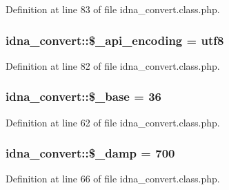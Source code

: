 Definition at line 83 of file idna\+\_\+convert.\+class.\+php.

\subsubsection[{\texorpdfstring{\$\+\_\+api\+\_\+encoding}{$_api_encoding}}]{\setlength{\rightskip}{0pt plus 5cm}idna\+\_\+convert\+::\$\+\_\+api\+\_\+encoding = \textquotesingle{}utf8\textquotesingle{}\hspace{0.3cm}{\ttfamily [protected]}}\hypertarget{classidna__convert_abc9b2aaad4b02a40602f254ac44ab973}{}\label{classidna__convert_abc9b2aaad4b02a40602f254ac44ab973}


Definition at line 82 of file idna\+\_\+convert.\+class.\+php.

\subsubsection[{\texorpdfstring{\$\+\_\+base}{$_base}}]{\setlength{\rightskip}{0pt plus 5cm}idna\+\_\+convert\+::\$\+\_\+base = 36\hspace{0.3cm}{\ttfamily [protected]}}\hypertarget{classidna__convert_ae8b8b5bddd4d164dea30f7097274ac24}{}\label{classidna__convert_ae8b8b5bddd4d164dea30f7097274ac24}


Definition at line 62 of file idna\+\_\+convert.\+class.\+php.

\subsubsection[{\texorpdfstring{\$\+\_\+damp}{$_damp}}]{\setlength{\rightskip}{0pt plus 5cm}idna\+\_\+convert\+::\$\+\_\+damp = 700\hspace{0.3cm}{\ttfamily [protected]}}\hypertarget{classidna__convert_af291107adc3fc7062e734fe5654a5b4c}{}\label{classidna__convert_af291107adc3fc7062e734fe5654a5b4c}


Definition at line 66 of file idna\+\_\+convert.\+class.\+php.

